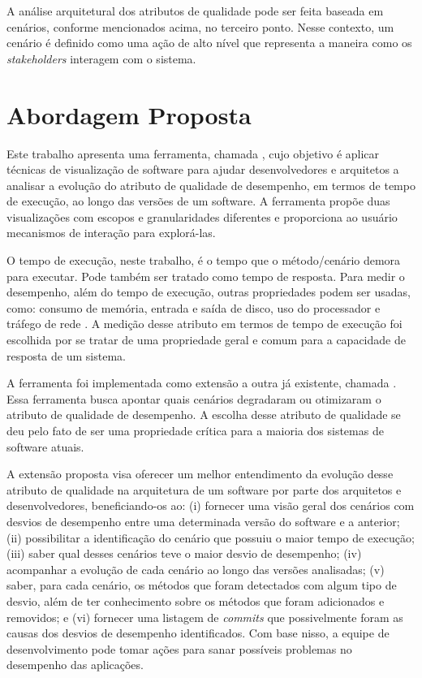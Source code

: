 A análise arquitetural dos atributos de qualidade pode ser feita baseada em cenários, conforme mencionados acima, no terceiro ponto. Nesse contexto, um cenário é definido como uma ação de alto nível que representa a maneira como os \textit{stakeholders} interagem com o sistema.

\section{Abordagem Proposta} \label{sec:abordagem-proposta}

Este trabalho apresenta uma ferramenta, chamada \textit{\toolName}, cujo objetivo é aplicar técnicas de visualização de software para ajudar desenvolvedores e arquitetos a analisar a evolução do atributo de qualidade de desempenho, em termos de tempo de execução, ao longo das versões de um software. A ferramenta propõe duas visualizações com escopos e granularidades diferentes e proporciona ao usuário mecanismos de interação para explorá-las.

O tempo de execução, neste trabalho, é o tempo que o método/cenário demora para executar. Pode também ser tratado como tempo de resposta. Para medir o desempenho, além do tempo de execução, outras propriedades podem ser usadas, como: consumo de memória, entrada e saída de disco, uso do processador e tráfego de rede \cite{Malik2013}. A medição desse atributo em termos de tempo de execução foi escolhida por se tratar de uma propriedade geral e comum para a capacidade de resposta de um sistema.


A ferramenta foi implementada como extensão a outra já existente, chamada \textit{\perfMinerName} \cite{Pinto2015}. Essa ferramenta busca apontar quais cenários degradaram ou otimizaram o atributo de qualidade de desempenho. A escolha desse atributo de qualidade se deu pelo fato de ser uma propriedade crítica para a maioria dos sistemas de software atuais.

A extensão proposta visa oferecer um melhor entendimento da evolução desse atributo de qualidade na arquitetura de um software por parte dos arquitetos e desenvolvedores, beneficiando-os ao: (i) fornecer uma visão geral dos cenários com desvios de desempenho entre uma determinada versão do software e a anterior; (ii) possibilitar a identificação do cenário que possuiu o maior tempo de execução; (iii) saber qual desses cenários teve o maior desvio de desempenho; (iv) acompanhar a evolução de cada cenário ao longo das versões analisadas; (v) saber, para cada cenário, os métodos que foram detectados com algum tipo de desvio, além de ter conhecimento sobre os métodos que foram adicionados e removidos; e (vi) fornecer uma listagem de \textit{commits} que possivelmente foram as causas dos desvios de desempenho identificados. Com base nisso, a equipe de desenvolvimento pode tomar ações para sanar possíveis problemas no desempenho das aplicações.

